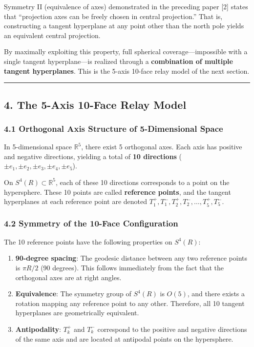\documentclass[a4paper,11pt]{article}
\begin{document}
Symmetry II (equivalence of axes) demonstrated in the preceding paper
{[}2{]} states that ``projection axes can be freely chosen in central
projection.'' That is, constructing a tangent hyperplane at any point
other than the north pole yields an equivalent central projection.

By maximally exploiting this property, full spherical
coverage---impossible with a single tangent hyperplane---is realized
through a \textbf{combination of multiple tangent hyperplanes}. This is
the 5-axis 10-face relay model of the next section.

\begin{center}\rule{0.5\linewidth}{0.5pt}\end{center}

\subsection{4. The 5-Axis 10-Face Relay
Model}\label{the-5-axis-10-face-relay-model}

\subsubsection{4.1 Orthogonal Axis Structure of 5-Dimensional
Space}\label{orthogonal-axis-structure-of-5-dimensional-space}

In 5-dimensional space \(\mathbb{R}^5\), there exist 5 orthogonal axes.
Each axis has positive and negative directions, yielding a total of
\textbf{10 directions}
(\(\pm e_1, \pm e_2, \pm e_3, \pm e_4, \pm e_5\)).

On \(S^4(R) \subset \mathbb{R}^5\), each of these 10 directions
corresponds to a point on the hypersphere. These 10 points are called
\textbf{reference points}, and the tangent hyperplanes at each reference
point are denoted \(T_1^+, T_1^-, T_2^+, T_2^-, \ldots, T_5^+, T_5^-\).

\subsubsection{4.2 Symmetry of the 10-Face
Configuration}\label{symmetry-of-the-10-face-configuration}

The 10 reference points have the following properties on \(S^4(R)\):

\begin{enumerate}
\def\labelenumi{\arabic{enumi}.}
\item
  \textbf{90-degree spacing}: The geodesic distance between any two
  reference points is \(\pi R / 2\) (90 degrees). This follows
  immediately from the fact that the orthogonal axes are at right
  angles.
\item
  \textbf{Equivalence}: The symmetry group of \(S^4(R)\) is \(O(5)\),
  and there exists a rotation mapping any reference point to any other.
  Therefore, all 10 tangent hyperplanes are geometrically equivalent.
\item
  \textbf{Antipodality}: \(T_k^+\) and \(T_k^-\) correspond to the
  positive and negative directions of the same axis and are located at
  antipodal points on the hypersphere.
\end{enumerate}
\end{document}

